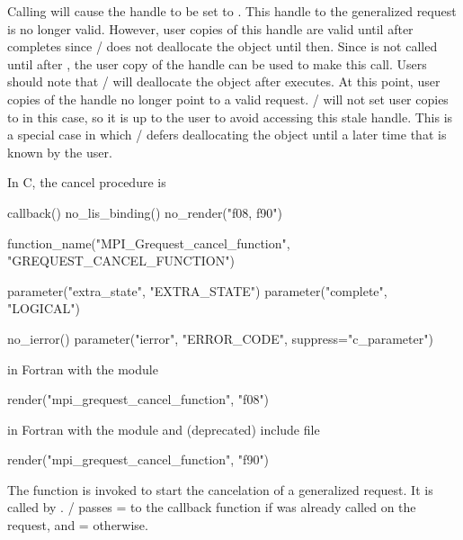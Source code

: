 \begin{users}
Calling  will cause the
 handle to be set to .
This handle to the generalized request is no longer valid.  However,
user copies of this handle are valid until after
 completes since \MPI/ does not deallocate the object
until then.  Since  is not
called until after , the user copy of
the handle can be used to make this call.  Users should note that
\MPI/ will deallocate the object after 
executes.  At this point, user copies of the  handle no
longer point to a valid request.  \MPI/ will not set user copies to
 in this case, so it is up to the user to
avoid accessing this stale handle.  This is a special case in which \mpi/
defers deallocating the object until a later time that is known by
the user.
\end{users}

In C, the cancel procedure is

\begin{mpi-binding}
    callback()
    no_lis_binding()
    no_render("f08, f90")
    
    function_name("MPI_Grequest_cancel_function", "GREQUEST_CANCEL_FUNCTION")
    
    parameter("extra_state", "EXTRA_STATE")
    parameter("complete", "LOGICAL")
    
    no_ierror()
    parameter("ierror", "ERROR_CODE", suppress="c_parameter")
\end{mpi-binding}

\par\noindent
in Fortran with the  module

\begin{mpi-binding}
    render("mpi_grequest_cancel_function", "f08")
\end{mpi-binding}

\par\noindent
in Fortran with the  module and (deprecated)  include file

\begin{mpi-binding}
    render("mpi_grequest_cancel_function", "f90")
\end{mpi-binding}

The  function is invoked to start the cancelation of
a generalized request.
It is called by .
\MPI/ passes  =  to the callback function if 
 was already called on the request,
and  =  otherwise.

